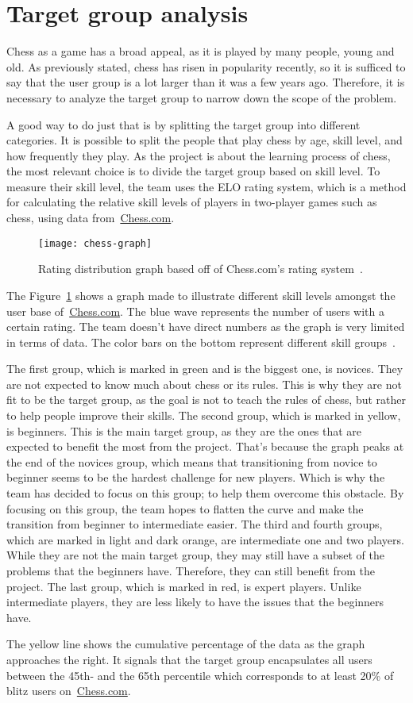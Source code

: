 \section{Target group analysis}\label{sec:target-group-analysis}

Chess as a game has a broad appeal, as it is played by many people, young and old.
As previously stated, chess has risen in popularity recently, so it is sufficed to say that the user group is a lot
larger than it was a few years ago.
Therefore, it is necessary to analyze the target group to narrow down the scope of the problem.

A good way to do just that is by splitting the target group into different categories.
It is possible to split the people that play chess by age, skill level, and how frequently they play.
As the project is about the learning process of chess, the most relevant choice is to divide the target group based on
skill level.
To measure their skill level, the team uses the ELO rating system, which is a method for calculating the relative skill
levels of players in two-player games such as chess, using data from~\url{Chess.com}.

\begin{figure}[H]
    \centering
    \texttt{[image: chess-graph]}
    \caption{Rating distribution graph based off of Chess.com's rating system~\cite{chess-ratings}.}\label{fig:graph}
\end{figure}

The Figure~\ref{fig:graph} shows a graph made to illustrate different skill levels amongst the user base
of~\url{Chess.com}.
The blue wave represents the number of users with a certain rating.
The team doesn't have direct numbers as the graph is very limited in terms of data.
The color bars on the bottom represent different skill groups~\cite{chess-ratings}.

The first group, which is marked in green and is the biggest one, is novices.
They are not expected to know much about chess or its rules.
This is why they are not fit to be the target group, as the goal is not to teach the rules of chess, but rather to help
people improve their skills.
The second group, which is marked in yellow, is beginners.
This is the main target group, as they are the ones that are expected to benefit the most from the project.
That's because the graph peaks at the end of the novices group, which means that transitioning from novice to beginner
seems to be the hardest challenge for new players.
Which is why the team has decided to focus on this group; to help them overcome this obstacle.
By focusing on this group, the team hopes to flatten the curve and make the transition from beginner to intermediate
easier.
The third and fourth groups, which are marked in light and dark orange, are intermediate one and two players.
While they are not the main target group, they may still have a subset of the problems that the beginners have.
Therefore, they can still benefit from the project.
The last group, which is marked in red, is expert players.
Unlike intermediate players, they are less likely to have the issues that the beginners have.

The yellow line shows the cumulative percentage of the data as the graph approaches the right.
It signals that the target group encapsulates all users between the 45th- and the 65th percentile which corresponds to
at least 20\% of blitz users on~\url{Chess.com}.
